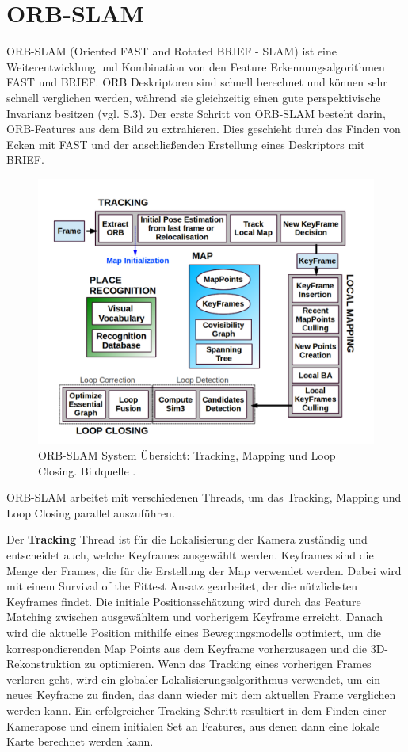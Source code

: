 \section{ORB-SLAM}

ORB-SLAM (Oriented FAST and Rotated BRIEF - SLAM) ist eine Weiterentwicklung und Kombination von den Feature Erkennungsalgorithmen FAST und BRIEF. ORB Deskriptoren sind schnell berechnet und können sehr schnell verglichen werden, während sie gleichzeitig einen gute perspektivische Invarianz besitzen (vgl. \cite{orbslam_og} S.3). Der erste Schritt von ORB-SLAM besteht darin, ORB-Features aus dem Bild zu extrahieren. Dies geschieht durch das Finden von Ecken mit FAST und der anschließenden Erstellung eines Deskriptors mit BRIEF.

\begin{figure}[H]
	\centering
	\includegraphics[scale=0.6]{orb.png}
	\caption{ORB-SLAM System Übersicht: Tracking, Mapping und Loop Closing. Bildquelle \cite{orbslam_og}.}
\end{figure} 

ORB-SLAM arbeitet mit verschiedenen Threads, um das Tracking, Mapping und Loop Closing parallel auszuführen. 

Der \textbf{Tracking} Thread ist für die Lokalisierung der Kamera zuständig und entscheidet auch, welche Keyframes ausgewählt werden. Keyframes sind die Menge der Frames, die für die Erstellung der Map verwendet werden. Dabei wird mit einem \glqq Survival of the Fittest\grqq{} Ansatz gearbeitet, der die nützlichsten Keyframes findet. Die initiale Positionsschätzung wird durch das Feature Matching zwischen ausgewähltem und vorherigem Keyframe erreicht. Danach wird die aktuelle Position mithilfe eines Bewegungsmodells optimiert, um die korrespondierenden Map Points aus dem Keyframe vorherzusagen und die 3D-Rekonstruktion zu optimieren. Wenn das Tracking eines vorherigen Frames verloren geht, wird ein globaler Lokalisierungsalgorithmus verwendet, um ein neues Keyframe zu finden, das dann wieder mit dem aktuellen Frame verglichen werden kann. Ein erfolgreicher Tracking Schritt resultiert in dem Finden einer Kamerapose und einem initialen Set an Features, aus denen dann eine lokale Karte berechnet werden kann. 

